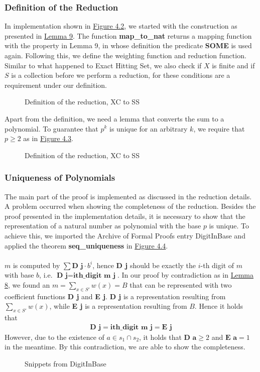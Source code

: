 \subsubsection{Definition of the Reduction}
In implementation shown in \hyperref[fig:4.2]{Figure 4.2}, we started with the construction as presented in \hyperref[lemma:9]{Lemma 9}. The function \textbf{map\_to\_nat} returns 
a mapping function with the property in Lemma 9, in whose definition the predicate \textbf{SOME} is used again.
Following this, we define the weighting function and reduction function. 
Similar to what happened to Exact Hitting Set, we also check if $X$ is finite and if $S$ is 
a collection before we perform a reduction, for these conditions are a requirement under our definition. 
\begin{figure}[!h]
    \caption{Definition of the reduction, XC to SS}
    \label{fig:4.2}
\end{figure}
Apart from the definition, we need a lemma that converts the sum to a polynomial. To guarantee that $p^k$ is unique for an arbitrary $k$, 
we require that $p \geq 2$ as in \hyperref[fig:4.3]{Figure 4.3}.
\begin{figure}[!h]
    \caption{Definition of the reduction, XC to SS}
    \label{fig:4.3}
\end{figure}

\subsubsection{Uniqueness of Polynomials}
The main part of the proof is implemented as discussed in the reduction details. A problem occurred when showing the completeness of the reduction. 
Besides the proof presented in the implementation details, it is necessary to show that the representation of a natural number as
polynomial with the base $p$ is unique. To achieve this, we imported the Archive of Formal Proofs entry DigitInBase and applied the theorem \textbf{seq\_uniqueness}
in \hyperref[fig:4.4]{Figure 4.4}.\\\\
$m$ is computed by $\sum \textbf{D j} \cdot b^i$, hence \textbf{D j} should be exactly the $i$-th 
digit of $m$ with base $b$, i.e. $\textbf{D j} = \textbf{ith\_digit m j}$. 
In our proof by contradiction as in \hyperref[lemma:sscompl]{Lemma 8}, 
we found an $m = \sum_{x \in S'} w(x) = B$ that can be represented with two coefficient functions \textbf{D j} and \textbf{E j}. 
\textbf{D j} is a representation resulting from $\sum_{x \in S'} w(x)$, 
while \textbf{E j} is a representation resulting from $B$.
Hence it holds that 
\begin{align*}
    \textbf{D j} = \textbf{ith\_digit m j} = \textbf{E j}
\end{align*}
However, due to the existence of $a \in s_1 \cap s_2$, it holds that $\textbf{D a} \geq 2$ and $\textbf{E a} = 1$ in the meantime. 
By this contradiction, we are able to show the completeness.
\begin{figure}[!h]
    \caption{Snippets from DigitInBase}
    \label{fig:4.4}
\end{figure}
